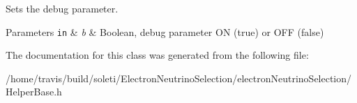 Sets the debug parameter. 


\begin{DoxyParams}[1]{Parameters}
\mbox{\tt in}  & {\em b} & Boolean, debug parameter O\-N (true) or O\-F\-F (false) \\
\hline
\end{DoxyParams}


The documentation for this class was generated from the following file\-:\begin{DoxyCompactItemize}
\item 
/home/travis/build/soleti/\-Electron\-Neutrino\-Selection/electron\-Neutrino\-Selection/Helper\-Base.\-h\end{DoxyCompactItemize}
